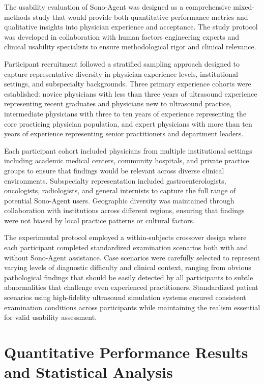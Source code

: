 The usability evaluation of Sono-Agent was designed as a comprehensive mixed-methods study that would provide both quantitative performance metrics and qualitative insights into physician experience and acceptance. The study protocol was developed in collaboration with human factors engineering experts and clinical usability specialists to ensure methodological rigor and clinical relevance.

Participant recruitment followed a stratified sampling approach designed to capture representative diversity in physician experience levels, institutional settings, and subspecialty backgrounds. Three primary experience cohorts were established: novice physicians with less than three years of ultrasound experience representing recent graduates and physicians new to ultrasound practice, intermediate physicians with three to ten years of experience representing the core practicing physician population, and expert physicians with more than ten years of experience representing senior practitioners and department leaders.

Each participant cohort included physicians from multiple institutional settings including academic medical centers, community hospitals, and private practice groups to ensure that findings would be relevant across diverse clinical environments. Subspecialty representation included gastroenterologists, oncologists, radiologists, and general internists to capture the full range of potential Sono-Agent users. Geographic diversity was maintained through collaboration with institutions across different regions, ensuring that findings were not biased by local practice patterns or cultural factors.

The experimental protocol employed a within-subjects crossover design where each participant completed standardized examination scenarios both with and without Sono-Agent assistance. Case scenarios were carefully selected to represent varying levels of diagnostic difficulty and clinical context, ranging from obvious pathological findings that should be easily detected by all participants to subtle abnormalities that challenge even experienced practitioners. Standardized patient scenarios using high-fidelity ultrasound simulation systems ensured consistent examination conditions across participants while maintaining the realism essential for valid usability assessment.

\section{Quantitative Performance Results and Statistical Analysis}

